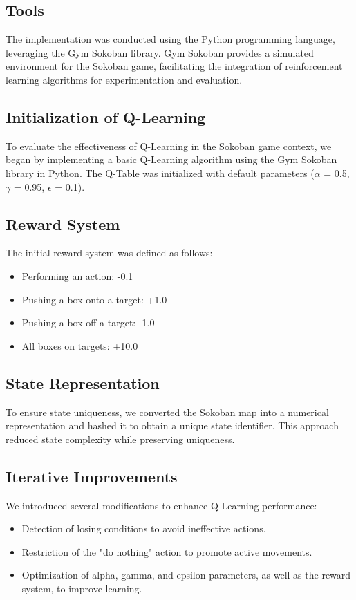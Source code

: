 \documentclass[10pt,twocolumn]{article}
\begin{document}
\subsection{Tools}

The implementation was conducted using the Python programming language, leveraging the Gym Sokoban library. Gym Sokoban provides a simulated environment for the Sokoban game, facilitating the integration of reinforcement learning algorithms for experimentation and evaluation.

\subsection{Initialization of Q-Learning}

To evaluate the effectiveness of Q-Learning in the Sokoban game context, we began by implementing a basic Q-Learning algorithm using the Gym Sokoban library in Python. The Q-Table was initialized with default parameters ($\alpha$ = 0.5, $\gamma$ = 0.95, $\epsilon$ = 0.1).

\subsection{Reward System}

The initial reward system was defined as follows:
\begin{itemize}
    \item Performing an action: -0.1
    \item Pushing a box onto a target: +1.0
    \item Pushing a box off a target: -1.0
    \item All boxes on targets: +10.0
\end{itemize}

\subsection{State Representation}

To ensure state uniqueness, we converted the Sokoban map into a numerical representation and hashed it to obtain a unique state identifier. This approach reduced state complexity while preserving uniqueness.

\subsection{Iterative Improvements}

We introduced several modifications to enhance Q-Learning performance:
\begin{itemize}
    \item Detection of losing conditions to avoid ineffective actions.
    \item Restriction of the "do nothing" action to promote active movements.
    \item Optimization of alpha, gamma, and epsilon parameters, as well as the reward system, to improve learning.
\end{itemize}
\end{document}
